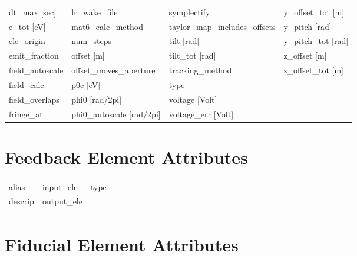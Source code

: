 \begin{tabular}{llll}
dt_max [sec]                     & lr_wake_file                     & symplectify                      & y_offset_tot [m]                 \\
e_tot [eV]                       & mat6_calc_method                 & taylor_map_includes_offsets      & y_pitch [rad]                    \\
ele_origin                       & num_steps                        & tilt [rad]                       & y_pitch_tot [rad]                \\
emit_fraction                    & offset [m]                       & tilt_tot [rad]                   & z_offset [m]                     \\
field_autoscale                  & offset_moves_aperture            & tracking_method                  & z_offset_tot [m]                 \\
field_calc                       & p0c [eV]                         & type                             &                                  \\
field_overlaps                   & phi0 [rad/2pi]                   & voltage [Volt]                   &                                  \\
fringe_at                        & phi0_autoscale [rad/2pi]         & voltage_err [Volt]               &                                  \\
 \bottomrule
 \end{tabular}
 \vfill
 
 \section{Feedback Element Attributes}
 \label{s:list.feedback}
 
 \begin{tabular}{llll} \toprule
alias                            & input_ele                        & type                             &                                  \\
descrip                          & output_ele                       &                                  &                                  \\
 \bottomrule
 \end{tabular}
 \vfill
 
 \section{Fiducial Element Attributes}
 \label{s:list.fiducial}
 
